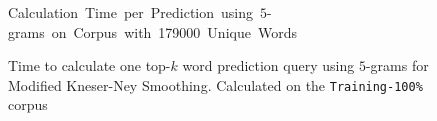 \begin{figure}[p!]
  \small
  \vspace{-3ex}
  \begin{center}
    \mbox{\hspace{-0.8cm}Calculation Time per Prediction using $5$-grams on Corpus with \num{179000} Unique Words}
  \end{center}

  \vspace{-0.2cm}
  \hspace{-0.16\textwidth}
  \normalsize
  \caption{Time to calculate one top-$k$ word prediction query using $5$-grams
    for Modified Kneser-Ney Smoothing. Calculated on the
    \texttt{Training-100\%} corpus}
  \label{fig:evaluation-time-nwp-mkn-predictions}
\end{figure}

